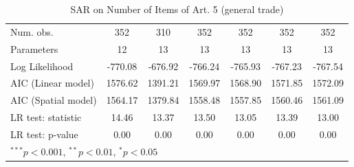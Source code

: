 \begin{table}[!h]
\begin{center}
\begin{tabular}{l c c c c c c }
\midrule
Num. obs.               & 352          & 310          & 352          & 352          & 352          & 352          \\
Parameters              & 12           & 13           & 13           & 13           & 13           & 13           \\
Log Likelihood          & -770.08      & -676.92      & -766.24      & -765.93      & -767.23      & -767.54      \\
AIC (Linear model)      & 1576.62      & 1391.21      & 1569.97      & 1568.90      & 1571.85      & 1572.09      \\
AIC (Spatial model)     & 1564.17      & 1379.84      & 1558.48      & 1557.85      & 1560.46      & 1561.09      \\
LR test: statistic      & 14.46        & 13.37        & 13.50        & 13.05        & 13.39        & 13.00        \\
LR test: p-value        & 0.00         & 0.00         & 0.00         & 0.00         & 0.00         & 0.00         \\
\bottomrule
\multicolumn{7}{l}{\scriptsize{$^{***}p<0.001$, $^{**}p<0.01$, $^*p<0.05$}}
\end{tabular}
\caption{SAR on Number of Items of Art. 5 (general trade)}
\label{table:coefficients}
\end{center}
\end{table}
